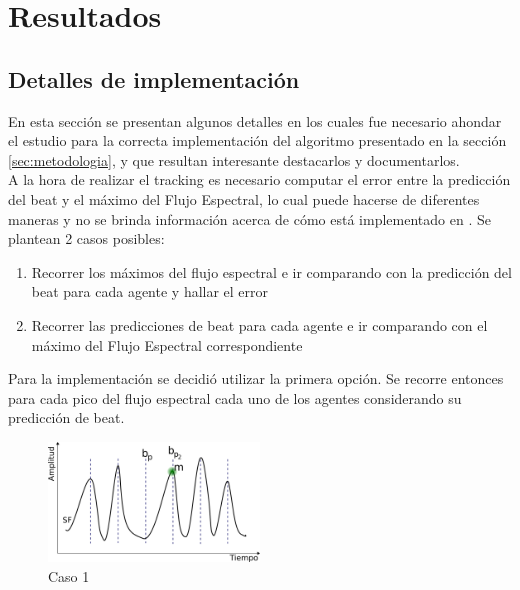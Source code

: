 \documentclass[12pt,a4paper,titlepage]{report}
\begin{document}
\chapter{Resultados}

\section{Detalles de implementación}
\label{sec:nosotros}

En esta sección se presentan algunos detalles en los cuales fue necesario ahondar el estudio para la correcta implementación del algoritmo presentado en la sección \ref{sec:metodologia}, y que resultan interesante destacarlos y documentarlos.\\

A la hora de realizar el tracking es necesario computar el error entre la predicción del beat y el máximo del Flujo Espectral, lo cual puede hacerse de diferentes maneras y no se brinda información acerca de cómo está implementado en \cite{bib:el_posta}. Se plantean 2 casos posibles:
\begin{enumerate}
\item Recorrer los máximos del flujo espectral e ir comparando con la predicción del beat para cada agente y hallar el error
\item Recorrer las predicciones de beat para cada agente e ir comparando con el máximo del Flujo Espectral correspondiente
\end{enumerate}
Para la implementación se decidió utilizar la primera opción. Se recorre entonces para cada pico del flujo espectral cada uno de los agentes considerando su predicción de beat.

\begin{figure}
	\vspace{-25pt}
	\begin{center}
	\includegraphics[width=0.5\textwidth]{./pics/caso1.png}
	\end{center}
	\vspace{-20pt}
	\caption{Caso 1}
	\label{fig:caso1}
\end{figure}
\end{document}
